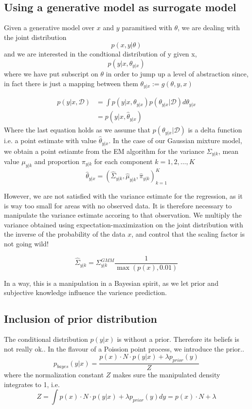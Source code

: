 \subsection{Using a generative model as surrogate model}

Given a generative model over $x$ and $y$ paramitised with $\theta$, we are dealing with the joint distribution
$$p(x,y|\theta)$$
and we are interested in the condtional distribution of y given x, 
$$p(y|x, \theta_{y|x})$$
where we have put subscript on $\theta$ in order to jump up a level of abstraction since, 
in fact there is just a mapping between them $\theta_{y|x} := g(\theta, y, x)$ 




\begin{align*}
    p(y|x, \mathcal{D}) &= \int p(y|x,\theta_{y|x})p(\theta_{y|x}|\mathcal{D}) d\theta_{y|x}  \\
    &=  p(y|x,\hat \theta_{y|x})
\end{align*}
Where the last equation holds as we assume that $p(\theta_{y|x}|\mathcal{D})$ is a delta function
i.e. a point estimate with value $\hat \theta_{y|x}$. In the case of our Gaussian mixture model, 
we obtain a point estiamte from the EM algorithm for the variance $\Sigma_{y|k}$, mean value $\mu_{y|k}$ and proportion $\pi_{y|k}$
for each component $k = 1,2, \dots, K$
$$\hat \theta_{y|x} = (\hat\Sigma_{y|k}, \hat\mu_{y|k}, \hat\pi_{y|k})_{k=1}^K$$

However, we are not satisfied with the variance estimate for the regression, as it is way too small for areas with
no observed data. It is therefore necessary to manipulate the variance estimate accoring to that observation. 
We multiply the variance obtained using expectation-maximization on the joint distribution with the
inverse of the probability of the data $x$, and control that the scaling factor is not going wild!

$$\hat\Sigma_{y|k} =\Sigma_{y|k}^{GMM} \frac{1}{\max(p(x), 0.01)}$$

In a way, this is a manipulation in a Bayesian spirit, as we let prior and subjective knowledge influence the
varience prediction. 

\subsection{Inclusion of prior distribution}
The conditional distribution $p(y|x)$ is without a prior. Therefore
its beliefs is not really ok.. In the flavour of a Poission point process, 
we introduce the prior.. 
$$p_{bayes}(y|x) = \frac{p(x)\cdot N \cdot p(y|x) + \lambda p_{prior}(y)}{Z}$$
where the normalization constant $Z$ makes sure the manipulated density integrates
to 1, i.e. 
$$Z =\int p(x)\cdot N \cdot p(y|x) + \lambda p_{prior}(y) dy =p(x)\cdot N+\lambda $$


